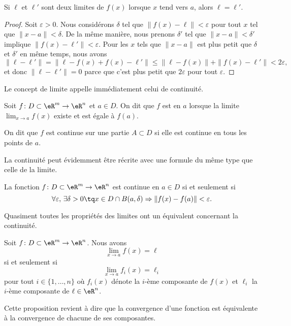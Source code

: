 \begin{lemma}
	Si $\ell$ et $\ell'$ sont deux limites de $f(x)$ lorsque $x$ tend vers $a$, alors $\ell=\ell'$.
\end{lemma}

\begin{proof}
	Soit $\varepsilon>0$. Nous considérons $\delta$ tel que $\| f(x)-\ell \|<\varepsilon$ pour tout $x$ tel que $\| x-a \|<\delta$. De la même manière, nous prenons $\delta'$ tel que $\| x-a \|<\delta'$ implique $\| f(x)-\ell' \|<\varepsilon$. Pour les $x$ tels que $\| x-a \|$ est plus petit que $\delta$ et $\delta'$ en même temps, nous avons
	\begin{equation}
		\| \ell-\ell' \|=\| \ell-f(x)+f(x)-\ell' \|\leq\| \ell-f(x) \|+\| f(x)-\ell' \|<2\varepsilon,
	\end{equation}
	et donc $\| \ell-\ell' \|=0$ parce que c'est plus petit que $2\varepsilon$ pour tout $\varepsilon$.
\end{proof}

Le concept de limite appelle immédiatement celui de continuité.
\begin{definition}
	Soit $f\colon D\subset\eR^m\to \eR^n $ et $a\in D$. On dit que $f$ est  en $a$ lorsque la limite $\lim_{x\to a} f(x)$ existe et est égale à $f(a)$.

	On dit que $f$ est continue sur une partie $A\subset D$ si elle est continue en tous les points de $a$.
\end{definition}

La continuité peut évidemment être récrite avec une formule du même type que celle de la limite.
\begin{proposition}
	La fonction $f\colon D\subset\eR^m\to \eR^n$ est continue en $a\in D$ si et seulement si
	\begin{equation}
		\forall\varepsilon,\,\exists\delta>0\tq x\in D\cap B(a,\delta)\Rightarrow \| f(x)-f(a) \|<\varepsilon.
	\end{equation}
\end{proposition}

Quasiment toutes les propriétés des limites ont un équivalent concernant la continuité.
\begin{proposition}	\label{PropLimParcompos}
	Soit $f\colon D\subset\eR^m\to \eR^n$. Nous avons 
	\begin{equation}
		\lim_{x\to a} f(x)=\ell
	\end{equation}
	si et seulement si 
	\begin{equation}
		\lim_{x\to a} f_i(x)=\ell_i
	\end{equation}
	pour tout $i\in\{ 1,\ldots,n \}$ où $f_i(x)$ dénote la $i$-ème composante de $f(x)$ et $\ell_i$ la $i$-ème composante de $\ell\in\eR^n$.
\end{proposition}
Cette proposition revient à dire que la convergence d'une fonction est équivalente à la convergence de chacune de ses composantes.

